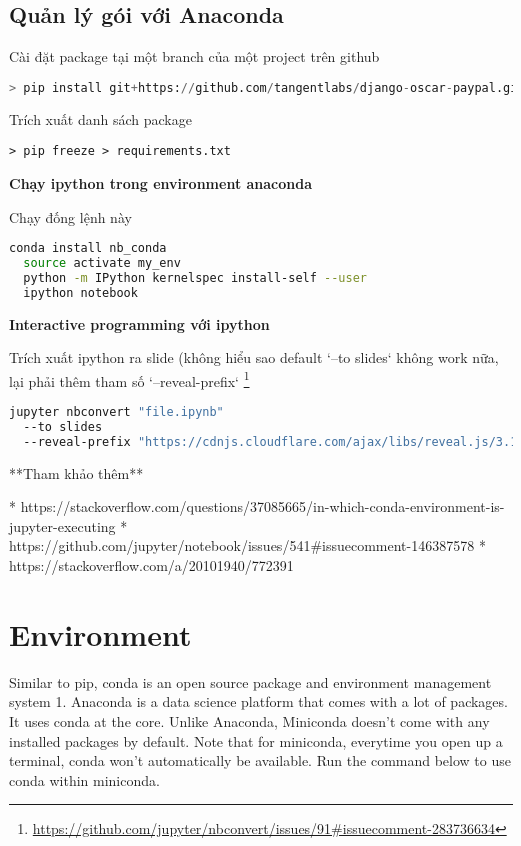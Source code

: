 \subsection{Quản lý gói với Anaconda}

\noindent Cài đặt package tại một branch của một project trên github

\begin{lstlisting}[language=Python]
> pip install git+https://github.com/tangentlabs/django-oscar-paypal.git@issue/34/oscar-0.6#egg=django-oscar-paypal
\end{lstlisting}

\noindent Trích xuất danh sách package

\begin{lstlisting}
> pip freeze > requirements.txt
\end{lstlisting}

\noindent \textbf{Chạy ipython trong environment anaconda}

\noindent Chạy đống lệnh này

\begin{lstlisting}[language=bash]
  conda install nb_conda
  source activate my_env
  python -m IPython kernelspec install-self --user
  ipython notebook
\end{lstlisting}

\noindent \textbf{Interactive programming với ipython}

\noindent Trích xuất ipython ra slide (không hiểu sao default `--to slides` không work nữa, lại phải thêm tham số `--reveal-prefix` \footnote{\href{https://github.com/jupyter/nbconvert/issues/91#issuecomment-283736634}{https://github.com/jupyter/nbconvert/issues/91#issuecomment-283736634}}

\begin{lstlisting}[language=bash]
jupyter nbconvert "file.ipynb"
  --to slides
  --reveal-prefix "https://cdnjs.cloudflare.com/ajax/libs/reveal.js/3.1.0"
\end{lstlisting}

**Tham khảo thêm**

* https://stackoverflow.com/questions/37085665/in-which-conda-environment-is-jupyter-executing
* https://github.com/jupyter/notebook/issues/541#issuecomment-146387578
* https://stackoverflow.com/a/20101940/772391
\section{Environment}

Similar to pip, conda is an open source package and environment management system 1. Anaconda is a data science platform that comes with a lot of packages. It uses conda at the core. Unlike Anaconda, Miniconda doesn't come with any installed packages by default. Note that for miniconda, everytime you open up a terminal, conda won't automatically be available. Run the command below to use conda within miniconda.

